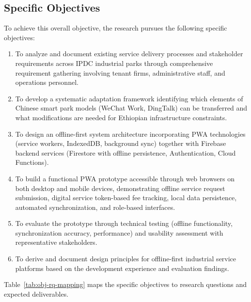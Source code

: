 \subsection{Specific Objectives}

To achieve this overall objective, the research pursues the following specific objectives:

\begin{enumerate}
\item To analyze and document existing service delivery processes and stakeholder requirements across IPDC industrial parks through comprehensive requirement gathering involving tenant firms, administrative staff, and operations personnel.

\item To develop a systematic adaptation framework identifying which elements of Chinese smart park models (WeChat Work, DingTalk) can be transferred and what modifications are needed for Ethiopian infrastructure constraints.

\item To design an offline-first system architecture incorporating PWA technologies (service workers, IndexedDB, background sync) together with Firebase backend services (Firestore with offline persistence, Authentication, Cloud Functions).

\item To build a functional PWA prototype accessible through web browsers on both desktop and mobile devices, demonstrating offline service request submission, digital service token-based fee tracking, local data persistence, automated synchronization, and role-based interfaces.

\item To evaluate the prototype through technical testing (offline functionality, synchronization accuracy, performance) and usability assessment with representative stakeholders.

\item To derive and document design principles for offline-first industrial service platforms based on the development experience and evaluation findings.
\end{enumerate}

Table~\ref{tab:obj-rq-mapping} maps the specific objectives to research questions and expected deliverables.

